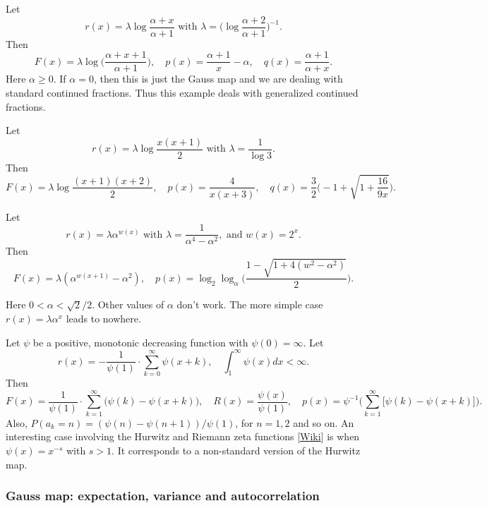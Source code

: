 \documentclass[oneside,10pt]{book}
\begin{document}
\noindent Let
$$r(x)=\lambda\log\frac{\alpha+x}{\alpha+1} \mbox{ with }\lambda=\Big(\log\frac{\alpha+2}{\alpha+1}\Big)^{-1}.$$
Then
$$F(x)=\lambda\log\Big(\frac{\alpha+x+1}{\alpha+1}\Big), \quad
p(x)=\frac{\alpha+1}{x}-\alpha, \quad q(x)=\frac{\alpha+1}{\alpha+x}.$$
Here $\alpha\geq 0$. If $\alpha=0$, then this is just the Gauss map and we are dealing with standard continued fractions.
 Thus this example deals with \textcolor{index}{generalized continued fractions}. \vspace{1ex}


\noindent Let
$$r(x)=\lambda\log\frac{x(x+1)}{2} \mbox{ with }\lambda=\frac{1}{\log 3}.$$
Then $$F(x)=\lambda\log\frac{(x+1)(x+2)}{2}, \quad
p(x)=\frac{4}{x(x+3)}, \quad q(x)=\frac{3}{2}\Bigg(-1+\sqrt{1+\frac{16}{9x}}\Bigg).$$


\noindent Let
$$r(x)=\lambda \alpha^{w(x)} \mbox{ with }\lambda=\frac{1}{\alpha^4-\alpha^2},
 \text{ and }w(x)=2^x.
$$
Then
$$ F(x)=\lambda(\alpha^{w(x+1)}-\alpha^2), \quad
p(x)=\log_2\log_\alpha\Bigg(\frac{1-\sqrt{1+4(w^2-\alpha^2)}}{2}\Bigg).$$

\noindent Here $0<\alpha<\sqrt{2}/2$. Other values of $\alpha$ don't work. The more simple case $r(x)=\lambda \alpha^x$ leads to nowhere. \vspace{1ex}


\noindent Let $\psi$ be a positive, monotonic decreasing function with $\psi(0)=\infty$.
Let
$$r(x)=-\frac{1}{\psi(1)}\cdot \sum_{k=0}^\infty \psi(x+k), \quad \int_1^\infty\psi(x)dx<\infty.$$
Then
$$F(x)= \frac{1}{\psi(1)}\cdot \sum_{k=1}^\infty \Big(\psi(k)-\psi(x+k)\Big),\quad
R(x)=\frac{\psi(x)}{\psi(1)}, \quad p(x)=\psi^{-1}\Bigg(\sum_{k=1}^\infty \Big[\psi(k)-\psi(x+k)\Big]\Bigg).$$
Also, $P(a_k=n) = (\psi(n)-\psi(n+1))/\psi(1)$, for $n=1,2$ and so on. An interesting case involving the
\textcolor{index}{Hurwitz} and
\textcolor{index}{Riemann zeta} functions  [\href{https://en.wikipedia.org/wiki/Hurwitz_zeta_function}{Wiki}] is when $\psi(x)=x^{-s}$ with $s>1$. It
 corresponds to a non-standard version of the \textcolor{index}{Hurwitz map}.


\subsubsection{Gauss map: expectation, variance and autocorrelation}
\end{document}
